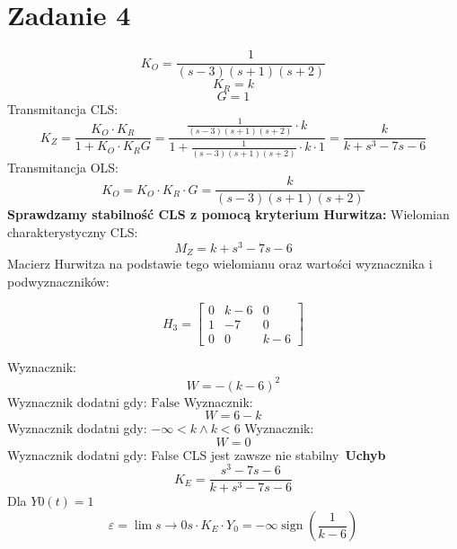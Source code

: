 \documentclass{article}
\begin{document}
        \section*{Zadanie 4}
    
$$K_O=\frac{1}{\left(s - 3\right) \left(s + 1\right) \left(s + 2\right)}$$
$$K_R=k$$
$$G=1$$
Transmitancja CLS:
$$K_Z=\frac{K_O\cdot K_R}{1+K_O\cdot K_RG}=\frac{\frac{1}{\left(s - 3\right) \left(s + 1\right) \left(s + 2\right)}\cdot k}{1+\frac{1}{\left(s - 3\right) \left(s + 1\right) \left(s + 2\right)}\cdot k\cdot 1}=\frac{k}{k + s^{3} - 7 s - 6}$$
Transmitancja OLS:
$$K_O=K_O\cdot K_R\cdot G=\frac{k}{\left(s - 3\right) \left(s + 1\right) \left(s + 2\right)}$$
\textbf{Sprawdzamy stabilność CLS z pomocą kryterium Hurwitza:}\newline
Wielomian charakterystyczny CLS:
$$M_Z=k + s^{3} - 7 s - 6$$
Macierz Hurwitza na podstawie tego wielomianu oraz wartości wyznacznika i podwyznaczników:

$$H_{3}=\left[\begin{matrix}0 & k - 6 & 0\\1 & -7 & 0\\0 & 0 & k - 6\end{matrix}\right]$$

Wyznacznik:$$W=- \left(k - 6\right)^{2}$$ Wyznacznik dodatni gdy: $\text{False}$\newline
Wyznacznik:$$W=6 - k$$ Wyznacznik dodatni gdy: $-\infty < k \wedge k < 6$\newline
Wyznacznik:$$W=0$$ Wyznacznik dodatni gdy: False\newline
CLS jest zawsze nie stabilny\
\textbf{Uchyb}\
$$K_E=\frac{s^{3} - 7 s - 6}{k + s^{3} - 7 s - 6}$$
 Dla $Y0(t)=1$
$$\varepsilon=\lim{s \rightarrow 0} {s\cdot K_E\cdot Y_0}=- \infty \operatorname{sign}{\left(\frac{1}{k - 6} \right)}$$
        
        
\end{document}
